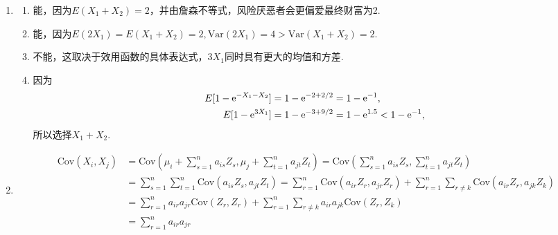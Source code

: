 \begin{enumerate}[label=\arabic{section}.\arabic*]
    \item \sol
    \begin{enumerate}[label=\alph*)]
        \item 能，因为$E(X_1+X_2)=2$，并由詹森不等式，风险厌恶者会更偏爱最终财富为2.
        \item 能，因为$E(2X_1)=E(X_1+X_2)=2,\mathrm{Var}(2X_1)=4>\mathrm{Var}(X_1+X_2)=2$.
        \item 不能，这取决于效用函数的具体表达式，$3X_1$同时具有更大的均值和方差.
        \item 因为
        \begin{align*}
            E[1-\mathrm{e}^{-X_1-X_2}]&=1-\mathrm{e}^{-2+2/2}=1-\mathrm{e}^{-1},\\
            E[1-\mathrm{e}^{3X_1}]&=1-\mathrm{e}^{-3+9/2}=1-\mathrm{e}^{1.5}<1-\mathrm{e}^{-1},
        \end{align*}
        所以选择$X_1+X_2$.
    \end{enumerate}
    \item \pro
    \begin{align*}
        \mathrm{Cov}(X_i,X_j)&=\mathrm{Cov}\left(\mu_i+\sum_{s=1}^na_{is}Z_s,\mu_j+\sum_{t=1}^na_{jt}Z_t\right)=\mathrm{Cov}\left(\sum_{s=1}^na_{is}Z_s,\sum_{t=1}^na_{jt}Z_t\right)\\
        &=\sum_{s=1}^n \sum_{t=1}^n \mathrm{Cov}\left(a_{is}Z_s,a_{jt}Z_t\right)=\sum_{r=1}^n \mathrm{Cov}\left(a_{ir}Z_r,a_{jr}Z_r\right)+\sum_{r=1}^n \sum_{r \neq k} \mathrm{Cov}\left(a_{ir}Z_r,a_{jk}Z_k\right)\\
        &=\sum_{r=1}^n a_{ir}a_{jr}\mathrm{Cov}\left(Z_r,Z_r\right)+\sum_{r=1}^n \sum_{r \neq k} a_{ir}a_{jk}\mathrm{Cov}\left(Z_r,Z_k\right)\\
        &=\sum_{r=1}^n a_{ir}a_{jr}
    \end{align*}
\end{enumerate}
\clearpage